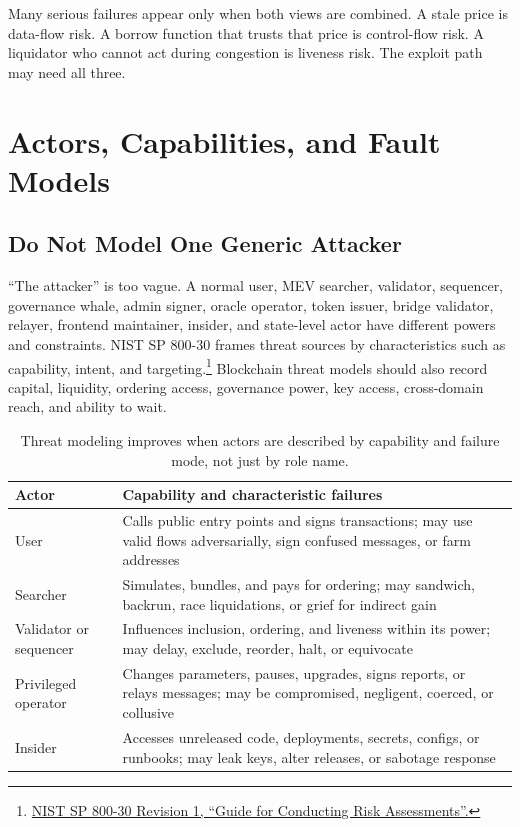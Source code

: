 Many serious failures appear only when both views are combined. A stale price is data-flow risk. A borrow function that trusts that price is control-flow risk. A liquidator who cannot act during congestion is liveness risk. The exploit path may need all three.

\section{Actors, Capabilities, and Fault Models}

\subsection{Do Not Model One Generic Attacker}

``The attacker'' is too vague. A normal user, MEV searcher, validator, sequencer, governance whale, admin signer, oracle operator, token issuer, bridge validator, relayer, frontend maintainer, insider, and state-level actor have different powers and constraints. NIST SP 800-30 frames threat sources by characteristics such as capability, intent, and targeting.\footnote{\href{https://nvlpubs.nist.gov/nistpubs/Legacy/SP/nistspecialpublication800-30r1.pdf}{NIST SP 800-30 Revision 1, ``Guide for Conducting Risk Assessments''.}} Blockchain threat models should also record capital, liquidity, ordering access, governance power, key access, cross-domain reach, and ability to wait.

\begin{table}[htbp]
\centering
\small
\renewcommand{\arraystretch}{1.18}
\begin{tabularx}{\textwidth}{@{}>{\RaggedRight\arraybackslash}p{}X@{}}
\toprule
Actor & Capability and characteristic failures \\
\midrule
User & Calls public entry points and signs transactions; may use valid flows adversarially, sign confused messages, or farm addresses \\
Searcher & Simulates, bundles, and pays for ordering; may sandwich, backrun, race liquidations, or grief for indirect gain \\
Validator or sequencer & Influences inclusion, ordering, and liveness within its power; may delay, exclude, reorder, halt, or equivocate \\
Privileged operator & Changes parameters, pauses, upgrades, signs reports, or relays messages; may be compromised, negligent, coerced, or collusive \\
Insider & Accesses unreleased code, deployments, secrets, configs, or runbooks; may leak keys, alter releases, or sabotage response \\
\bottomrule
\end{tabularx}
\caption{Threat modeling improves when actors are described by capability and failure mode, not just by role name.}
\end{table}

